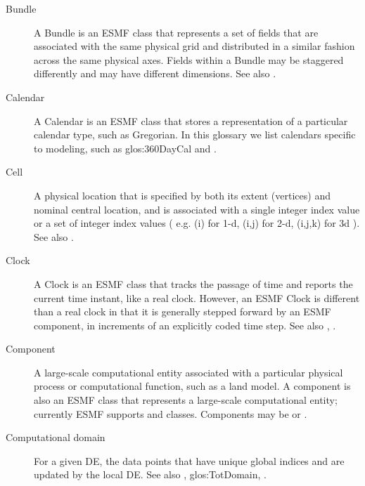 \begin{description}
\item[Bundle] \label{glos:Bundle} A Bundle is an ESMF class that represents 
  a set of fields that 
  are associated with the same physical grid and distributed in a similar 
  fashion across the same physical axes.  Fields within a Bundle may be
  staggered differently and may have different dimensions. 
  See also . 

\item[Calendar] \label{glos:Calendar} A Calendar is an ESMF class that 
  stores a representation of a particular calendar type, such as Gregorian.
  In this glossary we list calendars specific to modeling, 
  such as 
  {glos:360DayCal} and .

\item[Cell] \label{glos:Cell} A physical location that is specified by both 
  its extent (vertices) and nominal central location, and is associated with 
  a single integer index value or a set of integer index values ( e.g.
  (i) for 1-d, (i,j) for 2-d, (i,j,k) for 3d ). 
  See also .

\item[Clock] \label{glos:Clock} A Clock is an ESMF class that tracks the 
  passage of time and 
  reports the current time instant, like a real clock.  However, an ESMF Clock 
  is different than a real clock in that it is generally stepped forward 
  by an ESMF component, in increments of an explicitly coded time step.
  See also , .

\item[Component] \label{glos:Component} A large-scale computational entity 
  associated with a particular physical process or computational function, 
  such as a land model.  A component is also an ESMF class that represents
  a large-scale computational entity; currently ESMF supports  and  classes.
  Components may be  or 
  .  

\item[Computational domain] \label{glos:CompDomain} For a given DE, the 
  data points that have unique global indices and are updated by the local DE.  
  See also , 
  {glos:TotDomain}, .


\end{description}
